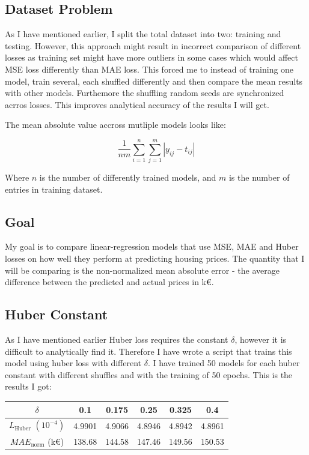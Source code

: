\documentclass{article}
\begin{document}
\subsection{Dataset Problem}

As I have mentioned earlier, I split the total dataset into two: training and testing.
However, this approach might result in incorrect comparison of different losses
as training set might have more outliers in some cases which would affect MSE loss
differently than MAE loss. This forced me to instead of training one model, train
several, each shuffled differently and then compare the mean results with other
models. Furthemore the shuffling random seeds are synchronized acrros losses. This
improves analytical accuracy of the results I will get.

The mean absolute value accross mutliple models looks like:

\[
\frac{1}{n m} \sum^n_{i=1} \sum^m_{j=1} {|y_{ij} - t_{ij}|}
\]

Where $n$ is the number of differently trained models, and $m$ is the number of
entries in training dataset.


\subsection{Goal}

My goal is to compare linear-regression models that use MSE, MAE and Huber losses
on how well they perform at predicting housing prices. The quantity that I will
be comparing is the non-normalized mean absolute error - the average
difference between the predicted and actual prices in k\euro.


\subsection{Huber Constant}

As I have mentioned earlier Huber loss requires the constant $\delta$, however
it is difficult to analytically find it. Therefore I have wrote a script that trains
this model using huber loss with different $\delta$. I have trained 50 models
for each huber constant with different shuffles and with the training of 50 epochs.
This is the results I got:



\begin{table}[H]
\centering
\begin{tabular}{c|c|c|c|c|c}
$\delta$ & 0.1 & 0.175 & 0.25 & 0.325 & 0.4 \\
\hline
$L_{\mathrm{Huber}}$ $(10^{-4})$ & 4.9901 & 4.9066 & 4.8946 & 4.8942 & 4.8961 \\
\hline
$MAE_{\mathrm{norm}}$ (k\euro) & 138.68 & 144.58 & 147.46 & 149.56 & 150.53 \\
\end{tabular}
\end{table}
\end{document}
